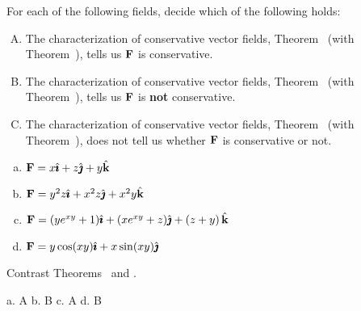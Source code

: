 \begin{question}
For each of the following fields, decide which of the following holds:
\begin{enumerate}[A.]
\item The characterization of conservative vector fields, Theorem~ (with Theorem~),  tells us $\mathbf{F}$ is conservative.
\item The characterization of conservative vector fields, Theorem~ (with Theorem~), tells us $\mathbf{F}$ is \textbf{not} conservative.
\item The characterization of conservative vector fields, Theorem~ (with Theorem~), does not tell us whether $\mathbf{F}$ is conservative or not.
\end{enumerate}

\begin{enumerate}[a.]
\item $\mathbf{F}=x\hat{\pmb{\imath}} + z\hat{\pmb{\jmath}} + y\hat{\mathbf{k}}$
\item $\mathbf{F}=y^2z\hat{\pmb{\imath}} + x^2z\hat{\pmb{\jmath}} + x^2y\hat{\mathbf{k}}$
\item $\mathbf{F}=(ye^{xy}+1)\hat{\pmb{\imath}} + (xe^{xy}+z)\hat{\pmb{\jmath}} + \left(z+y\right)\hat{\mathbf{k}}$
\item $\mathbf{F}=y\cos(xy)\hat{\pmb{\imath}} + x\sin(xy)\hat{\pmb{\jmath}} $
\end{enumerate}
\end{question}
\begin{hint}
Contrast Theorems~ and .
\end{hint}
\begin{answer}
a.  A\qquad
b.  B \qquad
c.  A \qquad
d.  B
\end{answer}
